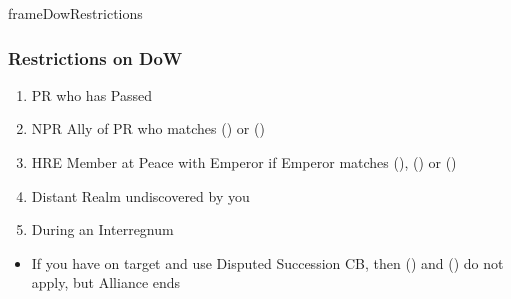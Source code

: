 \documentclass[10pt]{article}
\newlength{\fhDowRestrictions} \setlength\fhDowRestrictions{6\baselineskip}
\begin{document}
\addbackground
\addfooter

\begin{dynamiccontents*}{frameDowRestrictions}\begin{eubox}{\fhDowRestrictions}
	\begin{multicols}{2}
		\subsubsection*{Restrictions on DoW }
		\begin{enumerate}[label=\strong{\alph*}.]
			\item PR who has Passed
			\item NPR Ally of PR who matches () or ()
			\item HRE Member at Peace with Emperor if Emperor matches (), () or ()
			\item Distant Realm undiscovered by you
			\item During an Interregnum
		\end{enumerate}
		\begin{itemize}
			\item If you have \disputedsuccession on target and use Disputed Succession CB, then () and () do not apply, but Alliance ends
		\end{itemize}
	\end{multicols}
\end{eubox}\end{dynamiccontents*}
\end{document}
